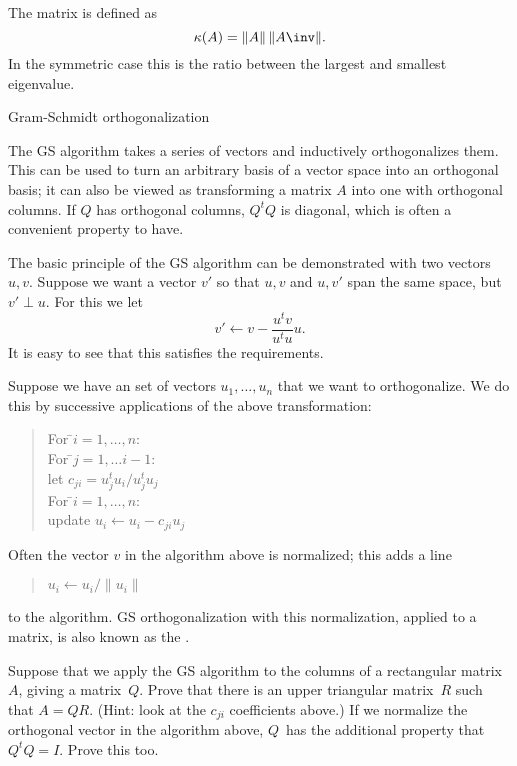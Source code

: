 The matrix  is defined as
\[ \kappa(A)=\|A\|\,\|A\inv\|. \]
In the symmetric case this is the ratio between the largest and
smallest eigenvalue.


 {Gram-Schmidt orthogonalization}
\label{app:gram-schmidt}

The \acf{GS} algorithm takes a series of vectors and inductively
orthogonalizes them. This can be used to turn an arbitrary basis of a
vector space into an orthogonal basis; it can also be viewed as
transforming a matrix $A$ into one with orthogonal columns. If $Q$ has
orthogonal columns, $Q^tQ$ is diagonal, which is often a convenient
property to have.

The basic principle of the \ac{GS} algorithm
can be demonstrated with two
vectors~$u,v$. Suppose we want a vector $v'$ so that $u,v$ and $u,v'$
span the same space, but $v'\perp u$. For this we let
\[ v'\leftarrow v-\frac{u^tv}{u^tu}u. \]
It is easy to see that this satisfies the requirements.

Suppose we have an set of vectors
$u_1,\ldots,u_n$ that we want to orthogonalize. We do this by
successive applications of the above transformation:

\begin{quote}
  \begin{tabbing}
    For \=$i=1,\ldots,n$:\\
    \> For \=$j=1,\ldots i-1$:\\
    \>\>let $c_{ji}=u_j^tu_i/u_j^tu_j$\\
    \> For \=$i=1,\ldots,n$:\\
    \>\> update $u_i\leftarrow u_i-c_{ji}u_j$
  \end{tabbing}
\end{quote}

Often the vector $v$ in the algorithm above is normalized; this adds a line
\begin{quote}
  \begin{tabbing}
    $u_i\leftarrow u_i/\|u_i\|$
  \end{tabbing}
\end{quote}
to the algorithm.
\ac{GS} orthogonalization with this normalization, applied to a
matrix, is also known as the .

\begin{exercise}
  Suppose that we apply the \ac{GS} algorithm to the columns of a
  rectangular matrix~$A$, giving a matrix~$Q$. Prove that there is an
  upper triangular matrix~$R$ such that $A=QR$. (Hint: look at the
  $c_{ji}$ coefficients above.) If we normalize the
  orthogonal vector in the algorithm above, $Q$~has the additional property
  that $Q^tQ=I$. Prove this too.
\end{exercise}


